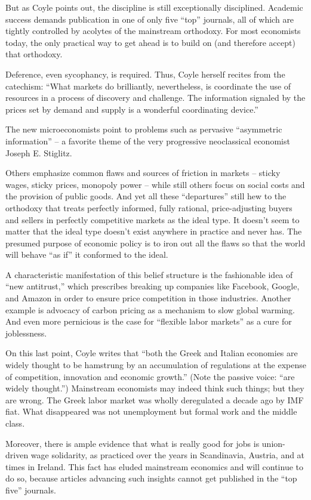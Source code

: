 \documentclass[
]{book}
\begin{document}
But as Coyle points out, the discipline is still exceptionally disciplined. Academic success demands publication in one of only five ``top'' journals, all of which are tightly controlled by acolytes of the mainstream orthodoxy. For most economists today, the only practical way to get ahead is to build on (and therefore accept) that orthodoxy.

Deference, even sycophancy, is required. Thus, Coyle herself recites from the catechism: ``What markets do brilliantly, nevertheless, is coordinate the use of resources in a process of discovery and challenge. The information signaled by the prices set by demand and supply is a wonderful coordinating device.''

The new microeconomists point to problems such as pervasive ``asymmetric information'' -- a favorite theme of the very progressive neoclassical economist Joseph E. Stiglitz.

Others emphasize common flaws and sources of friction in markets -- sticky wages, sticky prices, monopoly power -- while still others focus on social costs and the provision of public goods. And yet all these ``departures'' still hew to the orthodoxy that treats perfectly informed, fully rational, price-adjusting buyers and sellers in perfectly competitive markets as the ideal type. It doesn't seem to matter that the ideal type doesn't exist anywhere in practice and never has. The presumed purpose of economic policy is to iron out all the flaws so that the world will behave ``as if'' it conformed to the ideal.

A characteristic manifestation of this belief structure is the fashionable idea of ``new antitrust,'' which prescribes breaking up companies like Facebook, Google, and Amazon in order to ensure price competition in those industries. Another example is advocacy of carbon pricing as a mechanism to slow global warming. And even more pernicious is the case for ``flexible labor markets'' as a cure for joblessness.

On this last point, Coyle writes that ``both the Greek and Italian economies are widely thought to be hamstrung by an accumulation of regulations at the expense of competition, innovation and economic growth.'' (Note the passive voice: ``are widely thought.'') Mainstream economists may indeed think such things; but they are wrong. The Greek labor market was wholly deregulated a decade ago by IMF fiat. What disappeared was not unemployment but formal work and the middle class.

Moreover, there is ample evidence that what is really good for jobs is union-driven wage solidarity, as practiced over the years in Scandinavia, Austria, and at times in Ireland. This fact has eluded mainstream economics and will continue to do so, because articles advancing such insights cannot get published in the ``top five'' journals.
\end{document}

